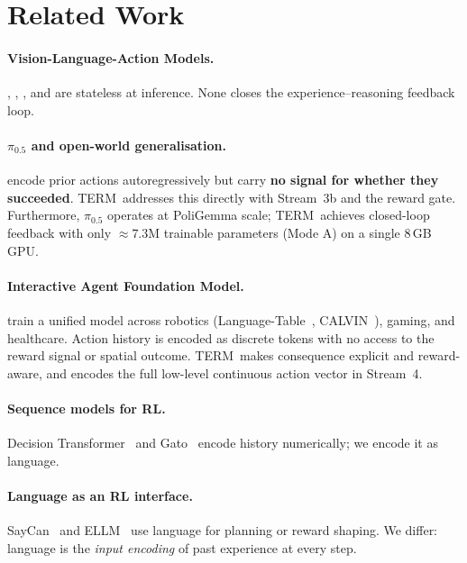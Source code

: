 \documentclass{article}
\newcommand{\modelname}{\textsc{TERM}\xspace}
\begin{document}
\section{Related Work}
\label{sec:related}

\paragraph{Vision-Language-Action Models.}
\citet{brohan2023rt2}, \citet{octo2024}, \citet{kim2024openvla},
and \citet{black2024pi0} are stateless at inference.
None closes the experience--reasoning feedback loop.

\paragraph{$\pi_{0.5}$ and open-world generalisation.}
\citet{hejna2025pi05} encode prior actions autoregressively
but carry \textbf{no signal for whether they succeeded}.
\modelname\ addresses this directly with Stream~3b and the reward gate.
Furthermore, $\pi_{0.5}$ operates at PoliGemma scale;
\modelname\ achieves closed-loop feedback with only ${\approx}7.3$M
trainable parameters (Mode A) on a single 8\,GB GPU.

\paragraph{Interactive Agent Foundation Model.}
\citet{durante2024agent} train a unified model across
robotics (Language-Table~\citep{lynch2023languagetable},
CALVIN~\citep{mees2022calvin}), gaming, and healthcare.
Action history is encoded as discrete tokens with no access to the reward
signal or spatial outcome.
\modelname\ makes consequence explicit and reward-aware, and
encodes the full low-level continuous action vector in Stream~4.

\paragraph{Sequence models for RL.}
Decision Transformer~\citep{chen2021decision} and Gato~\citep{reed2022gato}
encode history numerically; we encode it as language.

\paragraph{Language as an RL interface.}
SayCan~\citep{ahn2022saycan} and ELLM~\citep{du2023ellm} use language for
planning or reward shaping.
We differ: language is the \emph{input encoding} of past experience at
every step.
\end{document}
